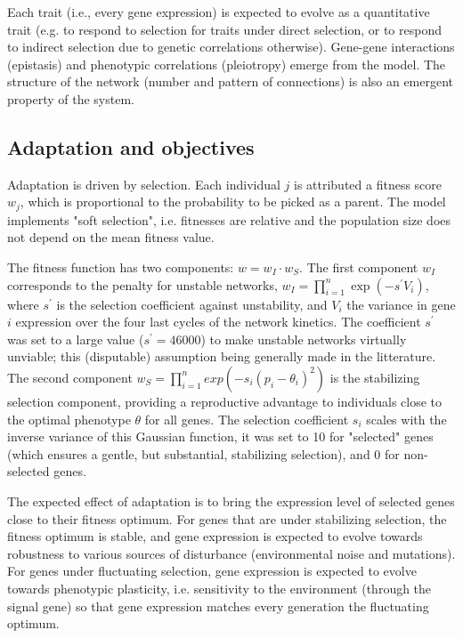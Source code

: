 \documentclass{article}
\begin{document}
Each trait (i.e., every gene expression) is expected to evolve as a quantitative trait (e.g. to respond to selection for traits under direct selection, or to respond to indirect selection due to genetic correlations otherwise). Gene-gene interactions (epistasis) and phenotypic correlations (pleiotropy) emerge from the model. The structure of the network (number and pattern of connections) is also an emergent property of the system. 

\subsection{Adaptation and objectives}

Adaptation is driven by selection. Each individual $j$ is attributed a fitness score $w_j$, which is proportional to the probability to be picked as a parent. The model implements "soft selection", i.e. fitnesses are relative and the population size does not depend on the mean fitness value. 

The fitness function has two components: $w = w_I \cdot w_S$. The first component $w_I$ corresponds to the penalty for unstable networks, $w_I = \prod_{i=1}^n \exp(-s^\prime V_i)$, where $s^\prime$ is the selection coefficient against unstability, and $V_i$ the variance in gene $i$ expression over the four last cycles of the network kinetics. The coefficient $s^\prime$ was set to a large value ($s^\prime=46000$) to make unstable networks virtually unviable; this (disputable) assumption being generally made in the litterature. The second component $w_S = \prod_{i=1}^n exp(-s_i(p_i-\theta_i)^2)$ is the stabilizing selection component, providing a reproductive advantage to individuals close to the optimal phenotype $\theta$ for all genes. The selection coefficient $s_i$ scales with the inverse variance of this Gaussian function, it was set to 10 for "selected" genes (which ensures a gentle, but substantial, stabilizing selection), and 0 for non-selected genes. 

The expected effect of adaptation is to bring the expression level of selected genes close to their fitness optimum. For genes that are under stabilizing selection, the fitness optimum is stable, and gene expression is expected to evolve towards robustness to various sources of disturbance (environmental noise and mutations). For genes under fluctuating selection, gene expression is expected to evolve towards phenotypic plasticity, i.e. sensitivity to the environment (through the signal gene) so that gene expression matches every generation the fluctuating optimum. 
\end{document}
